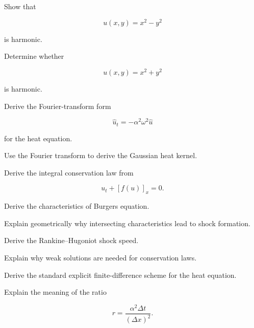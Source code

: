 \begin{exercise}[3]
Show that

\[
u(x,y)=x^2-y^2
\]

is harmonic.
\end{exercise}

\begin{exercise}[3]
Determine whether

\[
u(x,y)=x^2+y^2
\]

is harmonic.
\end{exercise}

\begin{exercise}[3]
Derive the Fourier-transform form

\[
\widehat{u}_t
=
-\alpha^2\omega^2\widehat{u}
\]

for the heat equation.
\end{exercise}

\begin{exercise}[3]
Use the Fourier transform to derive the Gaussian heat kernel.
\end{exercise}

\begin{exercise}[3]
Derive the integral conservation law from

\[
u_t+[f(u)]_x=0.
\]
\end{exercise}

\begin{exercise}[3]
Derive the characteristics of Burgers equation.
\end{exercise}

\begin{exercise}[3]
Explain geometrically why intersecting characteristics lead to shock
formation.
\end{exercise}

\begin{exercise}[3]
Derive the Rankine--Hugoniot shock speed.
\end{exercise}

\begin{exercise}[3]
Explain why weak solutions are needed for conservation laws.
\end{exercise}

\begin{exercise}[3]
Derive the standard explicit finite-difference scheme for the heat
equation.
\end{exercise}

\begin{exercise}[3]
Explain the meaning of the ratio

\[
r
=
\frac{
\alpha^2\Delta t
}{
(\Delta x)^2
}.
\]
\end{exercise}


